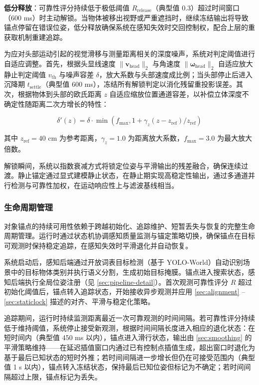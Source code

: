 \documentclass[review]{vgtc}
\begin{document}
\textbf{低分释放}：可靠性评分持续低于极低阈值 $R_{\mathrm{release}}$（典型值 0.3）超过时间窗口（600 ms）时主动解锁。当物体被移出视野或严重遮挡时，继续冻结输出将导致锚点停留在错误位姿，低分释放确保系统在感知失效时交回控制权，配合上层的重获取机制重建追踪。

为应对头部运动引起的视觉滑移与测量距离相关的深度噪声，系统对判定阈值进行自适应调整。首先，根据头显线速度 $\lVert \mathbf{v}_{\mathrm{head}} \rVert_2$ 与角速度 $\lVert \mathbf{\omega}_{\mathrm{head}} \rVert_2$ 自适应放大静止判定阈值 $v_{\mathrm{th}}$ 与噪声容差 $\delta$，放大系数与头部速度成比例；当头部停止后进入沉降期 $t_{\mathrm{settle}}$（典型值 600 ms），冻结所有解锁判定以消化残留重投影误差。其次，根据物体到头部的欧氏距离 $z$ 自适应缩放位置通道容差，以补偿立体深度不确定性随距离二次方增长的特性：

\begin{equation}
\delta'(z) = \delta \cdot \min\!\left(f_{\mathrm{max}}, 1 + \gamma_z (z - z_{\mathrm{ref}}) / z_{\mathrm{ref}}\right)
\label{eq:distance-adaptive}
\end{equation}


其中 $z_{\mathrm{ref}} = 40$ cm 为参考距离，$\gamma_z = 1.0$ 为距离放大系数，$f_{\mathrm{max}} = 3.0$ 为最大放大倍数。

解锁瞬间，系统以指数衰减方式将锁定位姿与平滑输出的残差融合，确保连续过渡。静止锚定通过显式建模静止状态，在静止期实现高稳定性输出，通过多通道并行检测与可靠性加权，在运动响应性上与滤波基线相当。

\subsubsection{生命周期管理}\label{sec:lifecycle}


对象锚点的持续可用性依赖于跨越初始化、追踪维护、短暂丢失与恢复的完整生命周期管理。运行时通过状态机协调感知质量监测与锚定策略切换，确保锚点在目标可观测时保持稳定追踪，在感知失效时平滑退化并自动恢复。

系统启动后，感知后端通过开放词表目标检测（基于 YOLO-World）自动识别场景中的目标物体类别并执行语义分割，生成初始目标掩膜。锚点进入搜索状态，感知后端执行全局位姿注册（见 \ref{sec:pipeline-detail}）。首次观测可靠性评分 $R$ 超过初始化阈值后，锚点转入追踪状态，开始接收异步观测并应用 \ref{sec:alignment} -- \ref{sec:staticlock} 描述的对齐、平滑与稳定化策略。

追踪期间，运行时持续监测距离最近一次可靠观测的时间间隔。若可靠性评分持续低于维持阈值，系统停止接受新观测，根据时间间隔长度进入相应的退化状态：在短时间内（典型值 450 ms 以内），锚点进入滑行状态，输出由 \ref{sec:smoothing} 的平滑策略维持------在延迟插值窗口内通过已有控制点插值生成，超出窗口时退化为基于最后已知状态的短时外推；若时间间隔进一步增长但仍在可接受范围内（典型值 1 s 以内），锚点转入冻结状态，保持最后已知位姿但标记为不确定；若时间间隔超过上限，锚点标记为丢失。
\end{document}
